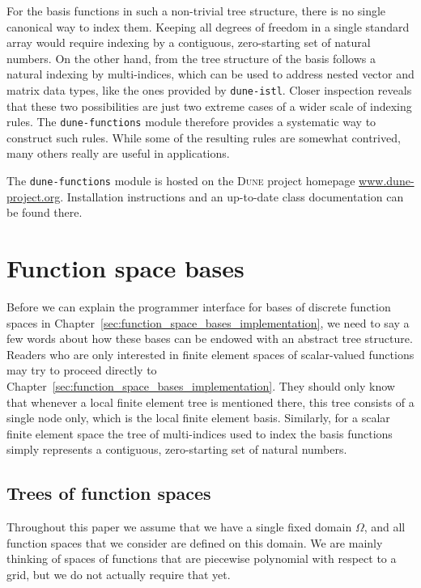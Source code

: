 \documentclass[a4paper,10pt,headings=normal,bibliography=totoc]{scrartcl}
\newcommand{\dune}{\textsc{Dune}\xspace}
\newcommand{\dunemodule}[1]{\texttt{#1}}
\begin{document}
For the basis functions in such a non-trivial tree structure, there is no single canonical way
to index them.  Keeping all degrees of freedom in a single standard array would require indexing
by a contiguous, zero-starting set of natural numbers. On the other hand, from the tree structure
of the basis follows a natural indexing by multi-indices, which can be used to address nested
vector and matrix data types, like the ones provided by \dunemodule{dune-istl}. Closer inspection
reveals that these two possibilities are just two extreme cases of a wider scale of indexing rules.
The \dunemodule{dune-functions} module therefore provides a systematic way to construct such
rules.  While some of the resulting rules are somewhat contrived, many others really are useful
in applications.

The \dunemodule{dune-functions} module is hosted on the \dune project homepage \url{www.dune-project.org}.
Installation instructions and an up-to-date class documentation can be found there.

\setcounter{tocdepth}{2}  %
\tableofcontents



\section{Function space bases}
\label{sec:finite_element_trees}


Before we can explain the programmer interface for bases of discrete function spaces in Chapter~\ref{sec:function_space_bases_implementation},
we need to say a few words about how these bases can be endowed with an abstract tree structure.
Readers who are only interested in finite element spaces of scalar-valued functions may try to proceed directly to
Chapter~\ref{sec:function_space_bases_implementation}.  They should only know that whenever a
local finite element tree
is mentioned there, this tree consists of a single node only, which is the local finite element basis.
Similarly, for a scalar finite element space the tree of multi-indices used to index the
basis functions simply represents a contiguous, zero-starting set of natural numbers.

\subsection{Trees of function spaces}

Throughout this paper we assume that we have a single fixed domain $\Omega$, and all function spaces
that we consider are defined on this domain.  We are mainly thinking of spaces of functions that are
piecewise polynomial with respect to a grid, but we do not actually require that yet.
\end{document}
